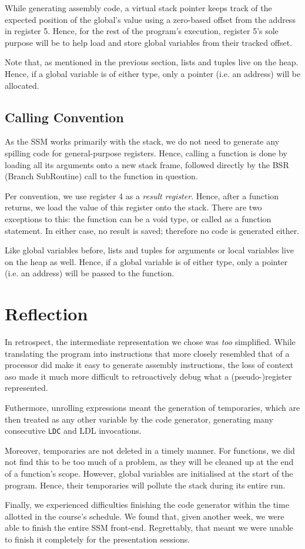 While generating assembly code, a virtual stack pointer keeps track of the expected position of the global's value using a zero-based offset from the address in register 5.
Hence, for the rest of the program's execution, register 5's sole purpose will be to help load and store global variables from their tracked offset.

Note that, as mentioned in the previous section, lists and tuples live on the heap.
Hence, if a global variable is of either type, only a pointer (i.e. an address) will be allocated.


\subsection{Calling Convention}

As the SSM works primarily with the stack, we do not need to generate any spilling code for general-purpose registers.
Hence, calling a function is done by loading all its arguments onto a new stack frame, followed directly by the BSR (Branch SubRoutine) call to the function in question.

Per convention, we use register 4 as a \emph{result register}.
Hence, after a function returns, we load the value of this register onto the stack.
There are two exceptions to this: the function can be a void type, or called as a function statement.
In either case, no result is saved; therefore no code is generated either.

Like global variables before, lists and tuples for arguments or local variables live on the heap as well.
Hence, if a global variable is of either type, only a pointer (i.e. an address) will be passed to the function.


\section{Reflection}

In retrospect, the intermediate representation we chose was \emph{too} simplified.
While translating the program into instructions that more closely resembled that of a processor did make it easy to generate assembly instructions, the loss of context aso made it much more difficult to retroactively debug what a (pseudo-)register represented.

Futhermore, unrolling expressions meant the generation of temporaries, which are then treated as any other variable by the code generator, generating many consecutive \texttt{LDC} and {LDL} invocations.

Moreover, temporaries are not deleted in a timely manner.
For functions, we did not find this to be too much of a problem, as they will be cleaned up at the end of a function's scope.
However, global variables are initialised at the start of the program.
Hence, their temporaries will pollute the stack during its entire run.

Finally, we experienced difficulties finishing the code generator within the time allotted in the course's schedule.
We found that, given another week, we were able to finish the entire SSM front-end.
Regrettably, that meant we were unable to finish it completely for the presentation sessions.
